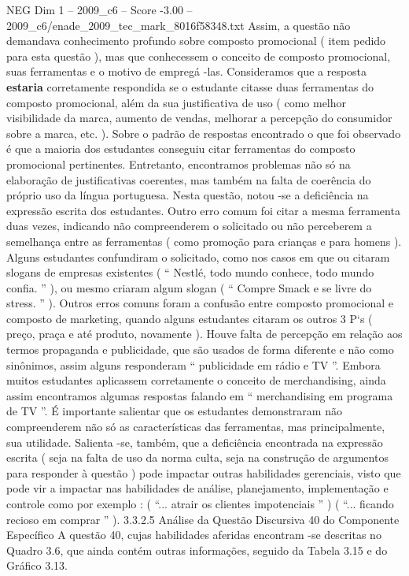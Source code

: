 \begin{textsample}{NEG Dim 1 – 2009\_c6 – Score -3.00 – 2009\_c6/enade\_2009\_tec\_mark\_8016f58348.txt}
Assim, a questão não demandava conhecimento profundo sobre composto promocional ( item pedido para esta questão ), mas que conhecessem o conceito de composto promocional, suas ferramentas e o motivo de empregá -las.
Consideramos que a resposta \textbf{estaria} corretamente respondida se o estudante citasse duas ferramentas do composto promocional, além da sua justificativa de uso ( como melhor visibilidade da marca, aumento de vendas, melhorar a percepção do consumidor sobre a marca, etc. ).
Sobre o padrão de respostas encontrado o que foi observado é que a maioria dos estudantes conseguiu citar ferramentas do composto promocional pertinentes.
Entretanto, encontramos problemas não só na elaboração de justificativas coerentes, mas também na falta de coerência do próprio uso da língua portuguesa.
Nesta questão, notou -se a deficiência na expressão escrita dos estudantes.
Outro erro comum foi citar a mesma ferramenta duas vezes, indicando não compreenderem o solicitado ou não perceberem a semelhança entre as ferramentas ( como promoção para crianças e para homens ).
Alguns estudantes confundiram o solicitado, como nos casos em que ou citaram slogans de empresas existentes ( “ Nestlé, todo mundo conhece, todo mundo confia. ” ), ou mesmo criaram algum slogan ( “ Compre Smack e se livre do stress. ” ).
Outros erros comuns foram a confusão entre composto promocional e composto de marketing, quando alguns estudantes citaram os outros 3 P`s ( preço, praça e até produto, novamente ).
Houve falta de percepção em relação aos termos propaganda e publicidade, que são usados de forma diferente e não como sinônimos, assim alguns responderam “ publicidade em rádio e TV ”.
Embora muitos estudantes aplicassem corretamente o conceito de merchandising, ainda assim encontramos algumas respostas falando em “ merchandising em programa de TV ”.
É importante salientar que os estudantes demonstraram não compreenderem não só as características das ferramentas, mas principalmente, sua utilidade.
Salienta -se, também, que a deficiência encontrada na expressão escrita ( seja na falta de uso da norma culta, seja na construção de argumentos para responder à questão ) pode impactar outras habilidades gerenciais, visto que pode vir a impactar nas habilidades de análise, planejamento, implementação e controle como por exemplo : ( “... atrair os clientes impotenciais ” ) ( “... ficando recioso em comprar ” ). 3.3.2.5 Análise da Questão Discursiva 40 do Componente Específico A questão 40, cujas habilidades aferidas encontram -se descritas no Quadro 3.6, que ainda contém outras informações, seguido da Tabela 3.15 e do Gráfico 3.13.

\end{textsample}
